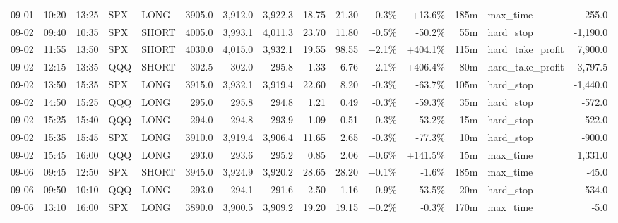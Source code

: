 \documentclass[11pt,a4paper,twoside]{article}
\begin{document}
\begin{landscape}
\begin{center}
\begin{longtable}{>{\color{txtmain}}l l l l l r r r r r r r r >{\color{txtmain}}l r}
09-01 & 10:20 & 13:25 & SPX & LONG & 3905.0 & 3,912.0 & 3,922.3 & 18.75 & 21.30 & \textcolor{wingreen}{+0.3\%} & \textcolor{wingreen}{+13.6\%} & 185m & max\_time & \textcolor{wingreen}{255.0} \\
09-02 & 09:40 & 10:35 & SPX & SHORT & 4005.0 & 3,993.1 & 4,011.3 & 23.70 & 11.80 & \textcolor{lossred}{-0.5\%} & \textcolor{lossred}{-50.2\%} & 55m & hard\_stop & \textcolor{lossred}{-1,190.0} \\
09-02 & 11:55 & 13:50 & SPX & SHORT & 4030.0 & 4,015.0 & 3,932.1 & 19.55 & 98.55 & \textcolor{wingreen}{+2.1\%} & \textcolor{wingreen}{+404.1\%} & 115m & hard\_take\_profit & \textcolor{wingreen}{7,900.0} \\
09-02 & 12:15 & 13:35 & QQQ & SHORT & 302.5 & 302.0 & 295.8 & 1.33 & 6.76 & \textcolor{wingreen}{+2.1\%} & \textcolor{wingreen}{+406.4\%} & 80m & hard\_take\_profit & \textcolor{wingreen}{3,797.5} \\
09-02 & 13:50 & 15:35 & SPX & LONG & 3915.0 & 3,932.1 & 3,919.4 & 22.60 & 8.20 & \textcolor{lossred}{-0.3\%} & \textcolor{lossred}{-63.7\%} & 105m & hard\_stop & \textcolor{lossred}{-1,440.0} \\
09-02 & 14:50 & 15:25 & QQQ & LONG & 295.0 & 295.8 & 294.8 & 1.21 & 0.49 & \textcolor{lossred}{-0.3\%} & \textcolor{lossred}{-59.3\%} & 35m & hard\_stop & \textcolor{lossred}{-572.0} \\
09-02 & 15:25 & 15:40 & QQQ & LONG & 294.0 & 294.8 & 293.9 & 1.09 & 0.51 & \textcolor{lossred}{-0.3\%} & \textcolor{lossred}{-53.2\%} & 15m & hard\_stop & \textcolor{lossred}{-522.0} \\
09-02 & 15:35 & 15:45 & SPX & LONG & 3910.0 & 3,919.4 & 3,906.4 & 11.65 & 2.65 & \textcolor{lossred}{-0.3\%} & \textcolor{lossred}{-77.3\%} & 10m & hard\_stop & \textcolor{lossred}{-900.0} \\
09-02 & 15:45 & 16:00 & QQQ & LONG & 293.0 & 293.6 & 295.2 & 0.85 & 2.06 & \textcolor{wingreen}{+0.6\%} & \textcolor{wingreen}{+141.5\%} & 15m & max\_time & \textcolor{wingreen}{1,331.0} \\
09-06 & 09:45 & 12:50 & SPX & SHORT & 3945.0 & 3,924.9 & 3,920.2 & 28.65 & 28.20 & \textcolor{wingreen}{+0.1\%} & \textcolor{lossred}{-1.6\%} & 185m & max\_time & \textcolor{lossred}{-45.0} \\
09-06 & 09:50 & 10:10 & QQQ & LONG & 293.0 & 294.1 & 291.6 & 2.50 & 1.16 & \textcolor{lossred}{-0.9\%} & \textcolor{lossred}{-53.5\%} & 20m & hard\_stop & \textcolor{lossred}{-534.0} \\
09-06 & 13:10 & 16:00 & SPX & LONG & 3890.0 & 3,900.5 & 3,909.2 & 19.20 & 19.15 & \textcolor{wingreen}{+0.2\%} & \textcolor{lossred}{-0.3\%} & 170m & max\_time & \textcolor{lossred}{-5.0} \\

\end{longtable}
\end{center}
\end{landscape}
\end{document}
